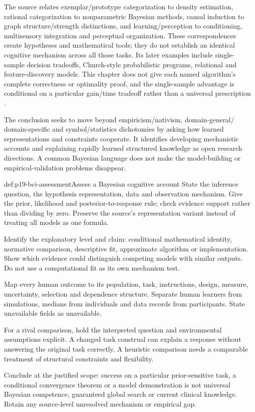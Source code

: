The source relates exemplar/prototype categorization to density estimation,
rational categorization to nonparametric Bayesian methods, causal induction
to graph structure/strength distinctions, and learning/perception to
conditioning, multisensory integration and perceptual organization.
These correspondences create hypotheses and mathematical tools; they
do not establish an identical cognitive mechanism across all those tasks.
Its later examples include single-sample decision tradeoffs, Church-style
probabilistic programs, relational and feature-discovery models. This
chapter does not give each named algorithm's complete correctness or
optimality proof, and the single-sample advantage is conditional on a
particular gain/time tradeoff rather than a universal prescription
\cite[pp.~31--33]{GriffithsTenenbaumKemp2012BayesianInference}.

The conclusion seeks to move beyond empiricism/nativism, domain-general/
domain-specific and symbol/statistics dichotomies by asking how learned
representations and constraints cooperate. It identifies developing
mechanistic accounts and explaining rapidly learned structured knowledge
as open research directions. A common Bayesian language does not make
the model-building or empirical-validation problems disappear.

\begin{hbmethod}{def:p19-bci-assessment}{Assess a Bayesian cognitive account}
State the inference question, the hypothesis representation, data and
observation mechanism. Give the prior, likelihood and posterior-to-response
rule; check evidence support rather than dividing by zero. Preserve the
source's representation variant instead of treating all models as one formula.

Identify the explanatory level and claim: conditional mathematical identity,
normative comparison, descriptive fit, approximate algorithm or implementation.
Show which evidence could distinguish competing models with similar outputs.
Do not use a computational fit as its own mechanism test.

Map every human outcome to its population, task, instructions, design,
measure, uncertainty, selection and dependence structure. Separate human
learners from simulations, medians from individuals and data records from
participants. State unavailable fields as unavailable.

For a rival comparison, hold the interpreted question and environmental
assumptions explicit. A changed task construal can explain a response
without answering the original task correctly. A heuristic comparison
needs a comparable treatment of structural constraints and flexibility.

Conclude at the justified scope: success on a particular prior-sensitive
task, a conditional convergence theorem or a model demonstration is not
universal Bayesian competence, guaranteed global search or current clinical
knowledge. Retain any source-level unresolved mechanism or empirical gap.
\end{hbmethod}

